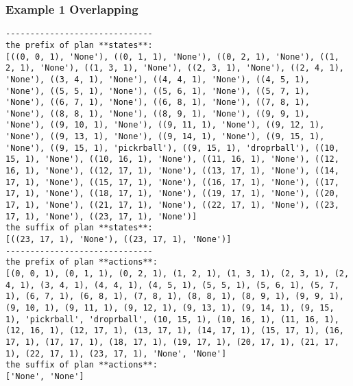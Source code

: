 \subsubsection*{Example 1 Overlapping}
\begin{lstlisting}
------------------------------
the prefix of plan **states**:
[((0, 0, 1), 'None'), ((0, 1, 1), 'None'), ((0, 2, 1), 'None'), ((1, 2, 1), 'None'), ((1, 3, 1), 'None'), ((2, 3, 1), 'None'), ((2, 4, 1), 'None'), ((3, 4, 1), 'None'), ((4, 4, 1), 'None'), ((4, 5, 1), 'None'), ((5, 5, 1), 'None'), ((5, 6, 1), 'None'), ((5, 7, 1), 'None'), ((6, 7, 1), 'None'), ((6, 8, 1), 'None'), ((7, 8, 1), 'None'), ((8, 8, 1), 'None'), ((8, 9, 1), 'None'), ((9, 9, 1), 'None'), ((9, 10, 1), 'None'), ((9, 11, 1), 'None'), ((9, 12, 1), 'None'), ((9, 13, 1), 'None'), ((9, 14, 1), 'None'), ((9, 15, 1), 'None'), ((9, 15, 1), 'pickrball'), ((9, 15, 1), 'droprball'), ((10, 15, 1), 'None'), ((10, 16, 1), 'None'), ((11, 16, 1), 'None'), ((12, 16, 1), 'None'), ((12, 17, 1), 'None'), ((13, 17, 1), 'None'), ((14, 17, 1), 'None'), ((15, 17, 1), 'None'), ((16, 17, 1), 'None'), ((17, 17, 1), 'None'), ((18, 17, 1), 'None'), ((19, 17, 1), 'None'), ((20, 17, 1), 'None'), ((21, 17, 1), 'None'), ((22, 17, 1), 'None'), ((23, 17, 1), 'None'), ((23, 17, 1), 'None')]
the suffix of plan **states**:
[((23, 17, 1), 'None'), ((23, 17, 1), 'None')]
------------------------------
the prefix of plan **actions**:
[(0, 0, 1), (0, 1, 1), (0, 2, 1), (1, 2, 1), (1, 3, 1), (2, 3, 1), (2, 4, 1), (3, 4, 1), (4, 4, 1), (4, 5, 1), (5, 5, 1), (5, 6, 1), (5, 7, 1), (6, 7, 1), (6, 8, 1), (7, 8, 1), (8, 8, 1), (8, 9, 1), (9, 9, 1), (9, 10, 1), (9, 11, 1), (9, 12, 1), (9, 13, 1), (9, 14, 1), (9, 15, 1), 'pickrball', 'droprball', (10, 15, 1), (10, 16, 1), (11, 16, 1), (12, 16, 1), (12, 17, 1), (13, 17, 1), (14, 17, 1), (15, 17, 1), (16, 17, 1), (17, 17, 1), (18, 17, 1), (19, 17, 1), (20, 17, 1), (21, 17, 1), (22, 17, 1), (23, 17, 1), 'None', 'None']
the suffix of plan **actions**:
['None', 'None']
\end{lstlisting}


